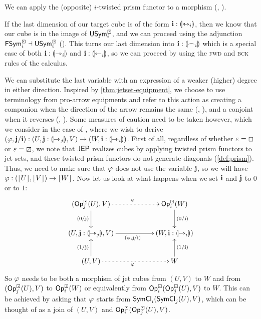 \documentclass[a4paper]{article}
\begin{document}
We can apply the (opposite) $i$-twisted prism functor to a morphism (, ).

If the last dimension of our target cube is of the form $\mathbf{i} : {\llparenthesis \leftrightarrowtriangle_i \rrparenthesis}$, then we know that our cube is in the image of $\mathsf{USym}^\boxdot_i$, and we can proceed using the adjunction $\mathsf{FSym}^\boxdot_i \dashv \mathsf{USym}^\boxdot_i$ ().
This turns our last dimension into $\mathbf{i} : {\llparenthesis \frown_i \rrparenthesis}$ which is a special case of both $\mathbf{i} : {\llparenthesis \rightarrowtriangle_i \rrparenthesis}$ and $\mathbf{i} : {\llparenthesis \leftarrowtriangle_i \rrparenthesis}$, so we can proceed by using the \textsc{fwd} and \textsc{bck} rules of the calculus.

We can substitute the last variable with an expression of a weaker (higher) degree in either direction.
Inspired by \cref{thm:jetset-equipment}, we choose to use terminology from pro-arrow equipments and refer to this action as creating a companion when the direction of the arrow remains the same (, ), and a conjoint when it reverses (, ).
Some measures of caution need to be taken however, which we consider in the case of , where we wish to derive $(\varphi, \mathbf{j} / \mathbf{i}) : (U, \mathbf{j} : {\llparenthesis \rightarrowtriangle_j \rrparenthesis}, V) \to (W, \mathbf{i} : {\llparenthesis \rightarrowtriangle_i \rrparenthesis})$.
First of all, regardless of whether $\varepsilon = \Box$ or $\varepsilon = \boxslash$, we note that $\mathsf{JEP}$ realizes cubes by applying twisted prism functors to jet sets, and these twisted prism functors do not generate diagonals (\cref{def:prism}). Thus, we need to make sure that $\varphi$ does not use the variable $\mathbf{j}$, so we will have $\varphi : (\mathopen{}\left\lfloor U \right\rfloor\mathclose{}, \mathopen{}\left\lfloor V \right\rfloor\mathclose{}) \to \mathopen{}\left\lfloor W \right\rfloor\mathclose{}$.
Now let us look at what happens when we set $\mathbf{i}$ and $\mathbf{j}$ to $0$ or to $1$:
\[
	\xymatrix{
		(\Opcube_j(U), V)
			\ar[d]_{(0/\dm j)}
			\ar@{.>}[rr]^\vfi
		&&
		\Opcube_i(W)
			\ar[d]^{(0/\dm i)}
		\\
		(U, \dm j : \rival{\jet_j}, V)
			\ar[rr]_{(\vfi, \dm j / \dm i)}
		&& (W, \dm i : \rival{\jet_i})
		\\
		(U, V)
			\ar[u]^{(1/\dm j)}
			\ar@{.>}[rr]_\vfi
		&&
		W
			\ar[u]_{(1/\dm i)}
	}
\]
So $\varphi$ needs to be both a morphism of jet cubes from $(U, V)$ to $W$ and from $({\mathsf{Op}}^\boxdot_j(U), V)$ to ${\mathsf{Op}}^\boxdot_i(W)$ or equivalently from ${\mathsf{Op}}^\boxdot_i({\mathsf{Op}}^\boxdot_j(U), V)$ to $W$. This can be achieved by asking that $\varphi$ starts from $\mathsf{SymCl}_i(\mathsf{SymCl}_j(U), V)$, which can be thought of as a join of $(U, V)$ and ${\mathsf{Op}}^\boxdot_i({\mathsf{Op}}^\boxdot_j(U), V)$.
\end{document}
